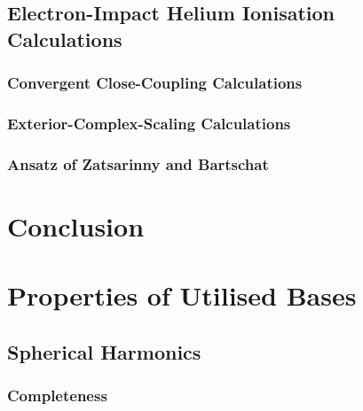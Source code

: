 \documentclass[draft]{article}
\begin{document}
\subsection{Electron-Impact Helium Ionisation Calculations}
\label{sec:e-he-ionisation-calculations}

\subsubsection{Convergent Close-Coupling Calculations}
\label{sec:e-he-ccc-calculations}

\subsubsection{Exterior-Complex-Scaling Calculations}
\label{sec:e-he-ecs-calculations}

\subsubsection{Ansatz of Zatsarinny and Bartschat}
\label{sec:e-he-ecs-calculations}

\section{Conclusion}
\label{sec:conclusion}

\clearpage





\clearpage

\appendix

\section{Properties of Utilised Bases}
\label{app:properties}

\subsection{Spherical Harmonics}
\label{app:spherical-harmonics}

\subsubsection{Completeness}
\label{app:spherical-harmonic-completeness}

\end{document}
